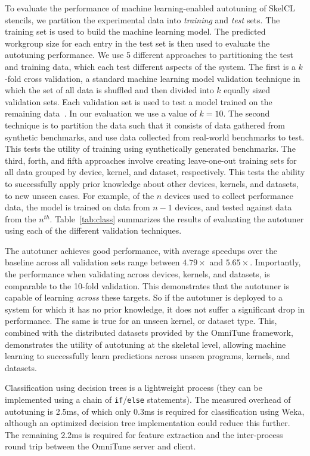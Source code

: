 \documentclass[nonatbib,preprint,nocopyrightspace,9pt]{sigplanconf}
\begin{document}
  To evaluate the performance of machine learning-enabled autotuning of
  SkelCL stencils, we partition the experimental data into
  \emph{training} and \emph{test} sets. The training set is used to
  build the machine learning model. The predicted workgroup size for each entry in
  the test set is then used to evaluate the autotuning performance. We use 5
  different approaches to partitioning the test and training data, which each test
  different aspects of the system. The first is a $k$-fold cross validation, a
  standard machine learning model validation technique in which the set of all
  data is shuffled and then divided into $k$ equally sized validation sets. Each
  validation set is used to test a model trained on the remaining
  data~\cite{Han2011}. In our evaluation we use a value of $k=10$. The second
  technique is to partition the data such that it consists of data gathered from
  synthetic benchmarks, and use data collected from real-world benchmarks to test.
  This tests the utility of training using synthetically generated benchmarks. The
  third, forth, and fifth approaches involve creating leave-one-out training sets
  for all data grouped by device, kernel, and dataset, respectively. This tests
  the ability to successfully apply prior knowledge about other devices, kernels,
  and datasets, to new unseen cases. For example, of the $n$ devices used to
  collect performance data, the model is trained on data from $n-1$ devices, and
  tested against data from the $n^{th}$. Table~\ref{tab:class} summarizes the
  results of evaluating the autotuner using each of the different validation
  techniques.

  The autotuner achieves good performance, with average speedups over the baseline
  across all validation sets range between $4.79\times$ and $5.65\times$.
  Importantly, the performance when validating across devices, kernels, and
  datasets, is comparable to the 10-fold validation. This demonstrates that the
  autotuner is capable of learning \emph{across} these targets. So if the
  autotuner is deployed to a system for which it has no prior knowledge, it does
  not suffer a significant drop in performance. The same is true for an unseen
  kernel, or dataset type. This, combined with the distributed datasets provided
  by the OmniTune framework, demonstrates the utility of autotuning at the
  skeletal level, allowing machine learning to successfully learn predictions
  across unseen programs, kernels, and datasets.

  Classification using decision trees is a lightweight process (they can be
  implemented using a chain of \texttt{if}/\texttt{else} statements). The measured
  overhead of autotuning is 2.5ms, of which only 0.3ms is required for
  classification using Weka, although an optimized decision tree implementation
  could reduce this further. The remaining 2.2ms is required for feature
  extraction and the inter-process round trip between the OmniTune server and
  client.
\end{document}
